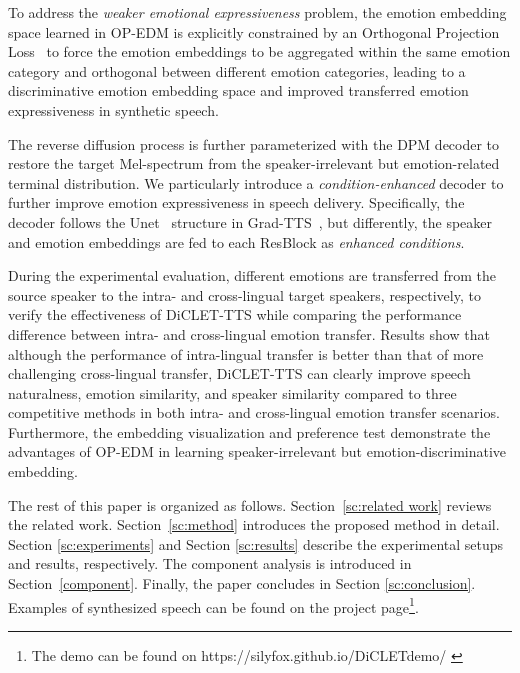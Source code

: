 \documentclass[journal,comsoc]{IEEEtran}
\begin{document}
To address the \textit{weaker emotional expressiveness} problem, the emotion embedding space learned in OP-EDM is explicitly constrained by an Orthogonal Projection Loss~\cite{ranasinghe2021orthogonal} to force the emotion embeddings to be aggregated within the same emotion category and orthogonal between different emotion categories, leading to a discriminative emotion embedding space and improved transferred emotion expressiveness in synthetic speech.

The reverse diffusion process is further parameterized with the DPM decoder to restore the target Mel-spectrum from the speaker-irrelevant but emotion-related terminal distribution. 
We particularly introduce a \textit{condition-enhanced} decoder to further improve emotion expressiveness in speech delivery. 
Specifically, the decoder follows the Unet~\cite{ronneberger2015u} structure in Grad-TTS~\cite{popov2021grad}, but differently, the speaker and emotion embeddings are fed to each ResBlock as \textit{enhanced conditions}.

During the experimental evaluation, different emotions are transferred from the source speaker to the intra- and cross-lingual target speakers, respectively, to verify the effectiveness of DiCLET-TTS while comparing the performance difference between intra- and cross-lingual emotion transfer. 
Results show that although the performance of intra-lingual transfer is better than that of more challenging cross-lingual transfer, DiCLET-TTS can clearly improve speech naturalness, emotion similarity, and speaker similarity compared to three competitive methods in both intra- and cross-lingual emotion transfer scenarios. 
Furthermore, the embedding visualization and preference test demonstrate the advantages of OP-EDM in learning speaker-irrelevant but emotion-discriminative embedding.

The rest of this paper is organized as follows. 
Section~\ref{sc:related work} reviews the related work. 
Section~\ref{sc:method} introduces the proposed method in detail.  
Section \ref{sc:experiments} and Section \ref{sc:results} describe the experimental setups and results, respectively.
The component analysis is introduced in Section~\ref{component}. 
Finally, the paper concludes in Section \ref{sc:conclusion}. 
Examples of synthesized speech can be found on the project page\footnote{The demo can be found on https://silyfox.github.io/DiCLETdemo/ \label{ft:homepage}}.
\end{document}
